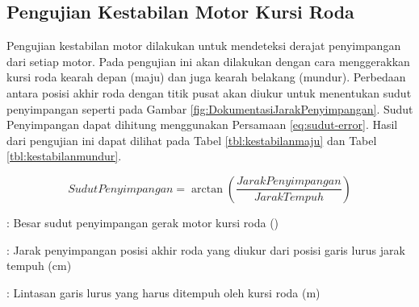 \subsection{Pengujian Kestabilan Motor Kursi Roda}

Pengujian kestabilan motor dilakukan untuk mendeteksi derajat penyimpangan dari setiap motor. Pada pengujian ini akan dilakukan dengan cara menggerakkan kursi roda kearah depan (maju) dan juga kearah belakang (mundur). Perbedaan antara posisi akhir roda dengan titik pusat akan diukur untuk menentukan sudut penyimpangan seperti pada Gambar \ref{fig:DokumentasiJarakPenyimpangan}. Sudut Penyimpangan dapat dihitung menggunakan Persamaan \ref{eq:sudut-error}. Hasil dari pengujian ini dapat dilihat pada Tabel \ref{tbl:kestabilanmaju} dan Tabel \ref{tbl:kestabilanmundur}.

\begin{equation}
  \label{eq:sudut-error}
  Sudut Penyimpangan = \arctan \left ( \frac{Jarak Penyimpangan}{Jarak Tempuh} \right )
\end{equation}

\begin{description}[nolistsep]
  \item[Keterangan]
  \item[Sudut Penyimpangan] : Besar sudut penyimpangan gerak motor kursi roda (\textdegree)
  \item[Jarak Penyimpangan] : Jarak penyimpangan posisi akhir roda yang diukur dari posisi garis lurus jarak tempuh (cm)
  \item[Jarak Tempuh] : Lintasan garis lurus yang harus ditempuh oleh kursi roda (m)
\end{description}

